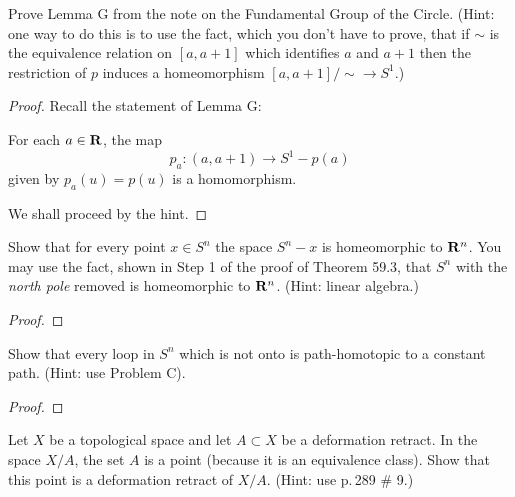 \newpage
\begin{problem}[(B)]
Prove Lemma G from the note on the Fundamental Group of the Circle. (Hint:
one way to do this is to use the fact, which you don’t have to prove, that
if $\sim$ is the equivalence relation on $[a,a+1]$ which identifies $a$ and
$a+1$ then the restriction of $p$ induces a homeomorphism
$[a,a+1]/{\sim}\to S^1$.)
\end{problem}
\begin{proof}
Recall the statement of Lemma G:
\begin{lemma*}[G]
For each $a\in\mathbf{R}$, the map
\[
p_a\colon(a,a+1)\longrightarrow S^1-p(a)
\]
given by $p_a(u)=p(u)$ is a homomorphism.
\end{lemma*}
We shall proceed by the hint.
\end{proof}
\newpage
\begin{problem}[(C)]
Show that for every point $x\in S^n$ the space $S^n-x$ is homeomorphic to
$\mathbf{R}^n$. You may use the fact, shown in Step 1 of the proof of Theorem
59.3, that $S^n$ with the \emph{north pole} removed is homeomorphic to
$\mathbf{R}^n$. (Hint: linear algebra.)
\end{problem}
\begin{proof}
\end{proof}
\newpage
\begin{problem}[(D)]
Show that every loop in $S^n$ which is not onto is path-homotopic to a
constant path. (Hint: use Problem C).
\end{problem}
\begin{proof}
\end{proof}
\newpage
\begin{problem}[(E)]
Let $X$ be a topological space and let $A\subset X$ be a deformation
retract. In the space $X/A$, the set $A$ is a point (because it is an
equivalence class). Show that this point is a deformation retract of
$X/A$. (Hint: use p.\,289 \# 9.)
\end{problem}
